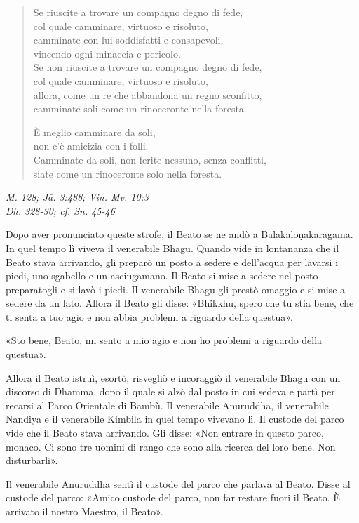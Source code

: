 \begin{quotation}
Se riuscite a trovare un compagno degno di fede, \\
col quale camminare, virtuoso e risoluto, \\
camminate con lui soddisfatti e consapevoli, \\
vincendo ogni minaccia e pericolo. \\
Se non riuscite a trovare un compagno degno di fede, \\
col quale camminare, virtuoso e risoluto, \\
allora, come un re che abbandona un regno sconfitto, \\
camminate soli come un rinoceronte nella foresta.


È meglio camminare da soli, \\
non c’è amicizia con i folli. \\
Camminate da soli, non ferite nessuno, senza conflitti, \\
siate come un rinoceronte solo nella foresta.
\end{quotation}

\emph{M. 128; Jā. 3:488; Vin. Mv. 10:3} \\
\emph{Dh. 328-30; cf. Sn. 45-46}


Dopo aver pronunciato queste strofe, il Beato se ne andò a
Bālakaloṇakāragāma. In quel tempo lì viveva il venerabile Bhagu. Quando
vide in lontananza che il Beato stava arrivando, gli preparò un posto a
sedere e dell’acqua per lavarsi i piedi, uno sgabello e un asciugamano.
Il Beato si mise a sedere nel posto preparatogli e si lavò i piedi. Il
venerabile Bhagu gli prestò omaggio e si mise a sedere da un lato.
Allora il Beato gli disse: «Bhikkhu, spero che tu stia bene, che ti
senta a tuo agio e non abbia problemi a riguardo della questua».


«Sto bene, Beato, mi sento a mio agio e non ho problemi a riguardo della
questua».


Allora il Beato istruì, esortò, risvegliò e incoraggiò il venerabile
Bhagu con un discorso di Dhamma, dopo il quale si alzò dal posto in cui
sedeva e partì per recarsi al Parco Orientale di Bambù. Il venerabile
Anuruddha, il venerabile Nandiya e il venerabile Kimbila in quel tempo
vivevano lì. Il custode del parco vide che il Beato stava arrivando. Gli
disse: «Non entrare in questo parco, monaco. Ci sono tre uomini di rango
che sono alla ricerca del loro bene. Non disturbarli».


Il venerabile Anuruddha sentì il custode del parco che parlava al Beato.
Disse al custode del parco: «Amico custode del parco, non far restare
fuori il Beato. È arrivato il nostro Maestro, il Beato».



